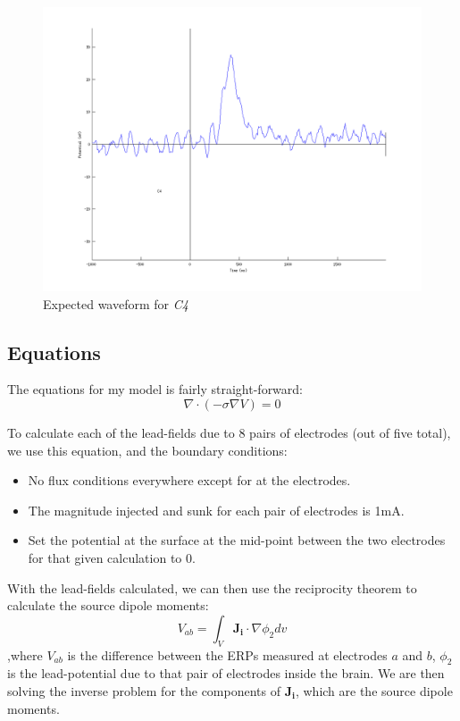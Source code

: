 \documentclass{article}
\begin{document}
\begin{figure}
    \begin{center}
        \includegraphics[scale=0.5]{C4.png}
        \caption{Expected waveform for \emph{C4}}
    \end{center}
\end{figure}

\subsection{Equations}
The equations for my model is fairly straight-forward: \[\nabla\cdot(-\sigma\nabla V)=0\]

To calculate each of the lead-fields due to 8 pairs of electrodes (out of five total), we use this equation, and the boundary conditions:
\begin{itemize}
    \item No flux conditions everywhere except for at the electrodes.
    \item The magnitude injected and sunk for each pair of electrodes is 1mA.
    \item Set the potential at the surface at the mid-point between the two electrodes for that given calculation to 0.
\end{itemize}

With the lead-fields calculated, we can then use the reciprocity theorem to calculate the source dipole moments:
\[V_{ab}=\int_V \mathbf{J_i}\cdot\nabla\phi_2 dv\]
,where $V_{ab}$ is the difference between the ERPs measured at electrodes $a$ and $b$, $\phi_2$ is the lead-potential due to that pair of electrodes inside the brain. We are then solving the inverse problem for the components of $\mathbf{J_i}$, which are the source dipole moments.
\end{document}
